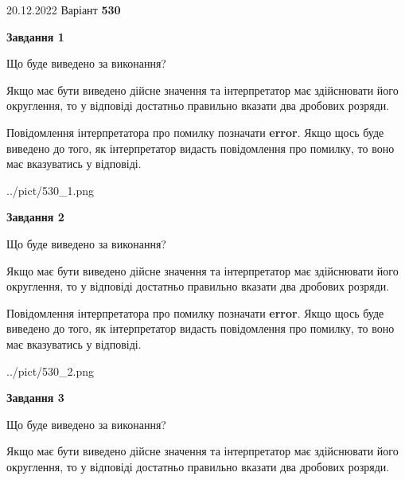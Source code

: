 \documentclass[12pt, ukrainian]{article}
\begin{document}
{20.12.2022 Варіант \No \textbf { 530 }\par}
{
\begin {Large}

{\begin {center}\textbf{Завдання 1}\end {center}}\par
Що буде виведено за виконання? \par

Якщо має бути виведено дійсне значення та інтерпретатор має здійснювати його округлення, 
то у відповіді достатньо правильно вказати два дробових розряди.

Повідомлення інтерпретатора про помилку позначати \textbf{error}.
Якщо щось буде виведено до того, як інтерпретатор видасть повідомлення про помилку, 
то воно має вказуватись у відповіді. \par

\begin{center}
	{../pict/530_1.png}
\end{center}
\newpage

{\begin {center}\textbf{Завдання 2}\end {center}}\par
Що буде виведено за виконання? \par

Якщо має бути виведено дійсне значення та інтерпретатор має здійснювати його округлення, 
то у відповіді достатньо правильно вказати два дробових розряди.

Повідомлення інтерпретатора про помилку позначати \textbf{error}.
Якщо щось буде виведено до того, як інтерпретатор видасть повідомлення про помилку, 
то воно має вказуватись у відповіді. \par

\begin{center}
	{../pict/530_2.png}
\end{center}
\newpage

{\begin {center}\textbf{Завдання 3}\end {center}}\par
Що буде виведено за виконання? \par

Якщо має бути виведено дійсне значення та інтерпретатор має здійснювати його округлення, 
то у відповіді достатньо правильно вказати два дробових розряди.


\end{Large}}
\end{document}
